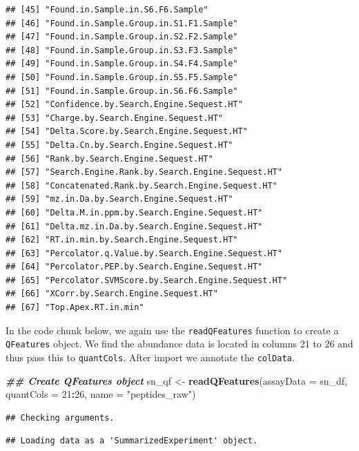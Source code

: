 \documentclass[9pt,a4paper,]{extarticle}
\newenvironment{Shaded}{\begin{snugshade}}{\end{snugshade}}
\newcommand{\AttributeTok}[1]{\textcolor[rgb]{0.13,0.29,0.53}{#1}}
\newcommand{\DecValTok}[1]{\textcolor[rgb]{0.00,0.00,0.81}{#1}}
\newcommand{\DocumentationTok}[1]{\textcolor[rgb]{0.56,0.35,0.01}{\textbf{\textit{#1}}}}
\newcommand{\FunctionTok}[1]{\textcolor[rgb]{0.13,0.29,0.53}{\textbf{#1}}}
\newcommand{\NormalTok}[1]{#1}
\newcommand{\OtherTok}[1]{\textcolor[rgb]{0.56,0.35,0.01}{#1}}
\newcommand{\SpecialCharTok}[1]{\textcolor[rgb]{0.81,0.36,0.00}{\textbf{#1}}}
\newcommand{\StringTok}[1]{\textcolor[rgb]{0.31,0.60,0.02}{#1}}
\begin{document}
\begin{verbatim}
## [45] "Found.in.Sample.in.S6.F6.Sample"                
## [46] "Found.in.Sample.Group.in.S1.F1.Sample"          
## [47] "Found.in.Sample.Group.in.S2.F2.Sample"          
## [48] "Found.in.Sample.Group.in.S3.F3.Sample"          
## [49] "Found.in.Sample.Group.in.S4.F4.Sample"          
## [50] "Found.in.Sample.Group.in.S5.F5.Sample"          
## [51] "Found.in.Sample.Group.in.S6.F6.Sample"          
## [52] "Confidence.by.Search.Engine.Sequest.HT"         
## [53] "Charge.by.Search.Engine.Sequest.HT"             
## [54] "Delta.Score.by.Search.Engine.Sequest.HT"        
## [55] "Delta.Cn.by.Search.Engine.Sequest.HT"           
## [56] "Rank.by.Search.Engine.Sequest.HT"               
## [57] "Search.Engine.Rank.by.Search.Engine.Sequest.HT" 
## [58] "Concatenated.Rank.by.Search.Engine.Sequest.HT"  
## [59] "mz.in.Da.by.Search.Engine.Sequest.HT"           
## [60] "Delta.M.in.ppm.by.Search.Engine.Sequest.HT"     
## [61] "Delta.mz.in.Da.by.Search.Engine.Sequest.HT"     
## [62] "RT.in.min.by.Search.Engine.Sequest.HT"          
## [63] "Percolator.q.Value.by.Search.Engine.Sequest.HT" 
## [64] "Percolator.PEP.by.Search.Engine.Sequest.HT"     
## [65] "Percolator.SVMScore.by.Search.Engine.Sequest.HT"
## [66] "XCorr.by.Search.Engine.Sequest.HT"              
## [67] "Top.Apex.RT.in.min"
\end{verbatim}

In the code chunk below, we again use the \texttt{readQFeatures} function to create a
\texttt{QFeatures} object. We find the abundance data is located in columns 21 to 26
and thus pass this to \texttt{quantCols}. After import we annotate the \texttt{colData}.

\begin{Shaded}
\begin{Highlighting}[]
\DocumentationTok{\#\# Create QFeatures object }
\NormalTok{sn\_qf }\OtherTok{\textless{}{-}} \FunctionTok{readQFeatures}\NormalTok{(}\AttributeTok{assayData =}\NormalTok{ sn\_df,}
                       \AttributeTok{quantCols =} \DecValTok{21}\SpecialCharTok{:}\DecValTok{26}\NormalTok{,}
                       \AttributeTok{name =} \StringTok{"peptides\_raw"}\NormalTok{)}
\end{Highlighting}
\end{Shaded}

\begin{verbatim}
## Checking arguments.
\end{verbatim}

\begin{verbatim}
## Loading data as a 'SummarizedExperiment' object.
\end{verbatim}
\end{document}
